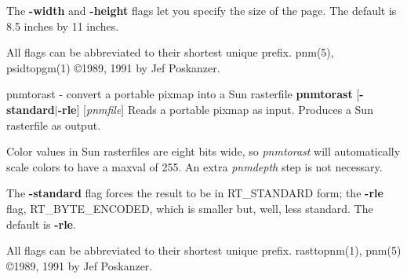 The
{\bf -width}
and
{\bf -height}
flags let you specify the size of the page.
The default is 8.5 inches by 11 inches.
\par
All flags can be abbreviated to their shortest unique prefix.
pnm(5), psidtopgm(1)
\copyright 1989, 1991 by Jef Poskanzer.
%
 
%

\newpage
%

pnmtorast - convert a portable pixmap into a Sun rasterfile
{\bf pnmtorast}
{\rm [}{\bf -standard}{\rm $|$}{\bf -rle}{\rm ]}
{\rm [}{\it pnmfile}{\rm ]}
Reads a portable pixmap as input.
Produces a Sun rasterfile as output.
\par
Color values in Sun rasterfiles are eight bits wide, so
{\it pnmtorast}
will automatically scale colors to have a maxval of 255.
An extra
{\it pnmdepth}
step is not necessary.
\par
The
{\bf -standard}
flag forces the result to be in RT\_STANDARD form; the
{\bf -rle}
flag, RT\_BYTE\_ENCODED, which is smaller but, well, less standard.
The default is
{\bf -rle}{\rm .}
\par
All flags can be abbreviated to their shortest unique prefix.
rasttopnm(1), pnm(5)
\copyright 1989, 1991 by Jef Poskanzer.
%
 
